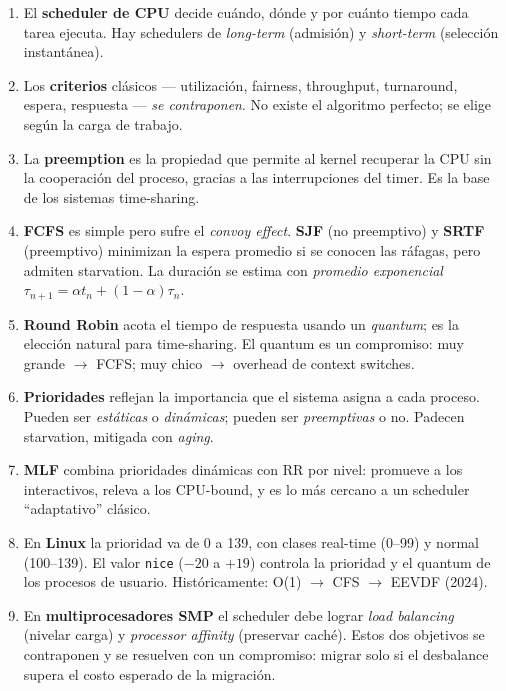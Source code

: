 \documentclass[11pt,a4paper]{article}
\begin{document}
\begin{enumerate}[leftmargin=*]
    \item El \textbf{scheduler de CPU} decide cuándo, dónde y por
        cuánto tiempo cada tarea ejecuta. Hay schedulers de
        \emph{long-term} (admisión) y \emph{short-term} (selección
        instantánea).
    \item Los \textbf{criterios} clásicos --- utilización, fairness,
        throughput, turnaround, espera, respuesta --- \emph{se
        contraponen}. No existe el algoritmo perfecto; se elige según
        la carga de trabajo.
    \item La \textbf{preemption} es la propiedad que permite al kernel
        recuperar la CPU sin la cooperación del proceso, gracias a las
        interrupciones del timer. Es la base de los sistemas
        time-sharing.
    \item \textbf{FCFS} es simple pero sufre el \emph{convoy effect}.
        \textbf{SJF} (no preemptivo) y \textbf{SRTF} (preemptivo)
        minimizan la espera promedio si se conocen las ráfagas, pero
        admiten starvation. La duración se estima con \emph{promedio
        exponencial} $\tau_{n+1} = \alpha t_n + (1-\alpha)\tau_n$.
    \item \textbf{Round Robin} acota el tiempo de respuesta usando
        un \emph{quantum}; es la elección natural para time-sharing.
        El quantum es un compromiso: muy grande $\to$ FCFS; muy chico
        $\to$ overhead de context switches.
    \item \textbf{Prioridades} reflejan la importancia que el sistema
        asigna a cada proceso. Pueden ser \emph{estáticas} o
        \emph{dinámicas}; pueden ser \emph{preemptivas} o no. Padecen
        starvation, mitigada con \emph{aging}.
    \item \textbf{MLF} combina prioridades dinámicas con RR por nivel:
        promueve a los interactivos, releva a los CPU-bound, y es lo
        más cercano a un scheduler ``adaptativo'' clásico.
    \item En \textbf{Linux} la prioridad va de 0 a 139, con clases
        real-time (0--99) y normal (100--139). El valor \texttt{nice}
        ($-20$ a $+19$) controla la prioridad y el quantum de los
        procesos de usuario. Históricamente: O(1) $\to$ CFS $\to$
        EEVDF (2024).
    \item En \textbf{multiprocesadores SMP} el scheduler debe lograr
        \emph{load balancing} (nivelar carga) y \emph{processor
        affinity} (preservar caché). Estos dos objetivos se
        contraponen y se resuelven con un compromiso: migrar solo si
        el desbalance supera el costo esperado de la migración.
\end{enumerate}
\end{document}

